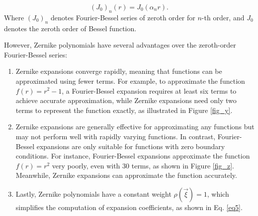 \begin{equation}
    (J_0)_n(r) = J_0(\alpha_n r).
\end{equation}
Where $(J_0)_n$ denotes Fourier-Bessel series of zeroth order for $n$-th order, and $J_0$ denotes the zeroth order of Bessel function.

However, Zernike polynomials have several advantages over the zeroth-order Fourier-Bessel series:
\begin{enumerate}
    \item Zernike expansions converge rapidly, meaning that functions can be approximated using fewer terms. For example, to approximate the function $f(r) = r^2 - 1$, a Fourier-Bessel expansion requires at least six terms to achieve accurate approximation, while Zernike expansions need only two terms to represent the function exactly, as illustrated in Figure \ref{fig_y}.
    \item Zernike expansions are generally effective for approximating any functions but may not perform well with rapidly varying functions. In contrast, Fourier-Bessel expansions are only suitable for functions with zero boundary conditions. For instance, Fourier-Bessel expansions approximate the function $f(r) = r^2$ very poorly, even with 30 terms, as shown in Figure \ref{fig_z}. Meanwhile, Zernike expansions can approximate the function accurately.
    \item Lastly, Zernike polynomials have a constant weight $\rho(\vec{\xi}) = 1$, which simplifies the computation of expansion coefficients, as shown in Eq. \ref{eq5}.
\end{enumerate}


